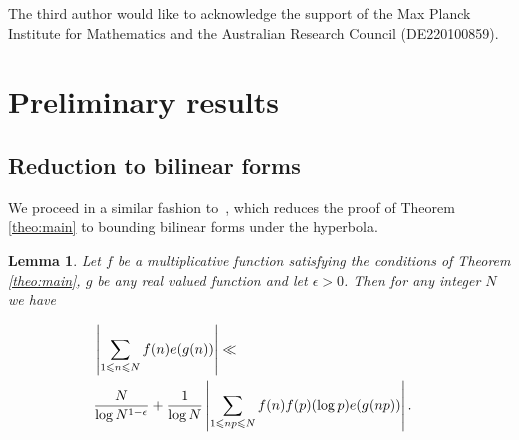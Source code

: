 \documentclass[12pt]{amsart}
\newtheorem{lemma}{Lemma}
\def\\{\cr}
\def\le{\leqslant}
\begin{document}
The third author would like to acknowledge the support of the Max Planck Institute for Mathematics and the Australian Research Council (DE220100859).
\section{Preliminary results}
\label{s1}
\subsection{Reduction to bilinear forms}
We proceed in a similar fashion to~\cite[Section~2]{M-V}, which reduces the proof of Theorem \ref{theo:main} to bounding bilinear 
forms under the hyperbola.
\begin{lemma}
\label{lem:bilinear}
Let $f$ be a multiplicative function satisfying the conditions of Theorem \ref{theo:main}, $g$ be any real valued function and let $\epsilon > 0$.  Then for any integer $N$ we have 

\begin{align}
\label{lem:eq}
\begin{split}
&\left|\sum_{1\le n \le N}f(n)e(g(n))\right|\ll \\ &\frac{N}{\log{N}^{1-\epsilon }} 
+\frac{1}{\log{N}}\left|\sum_{1\le np \le N} f(n)f(p)(\log{p}) e(g(np))\right|.
\end{split}
\end{align}
\end{lemma}
\end{document}
